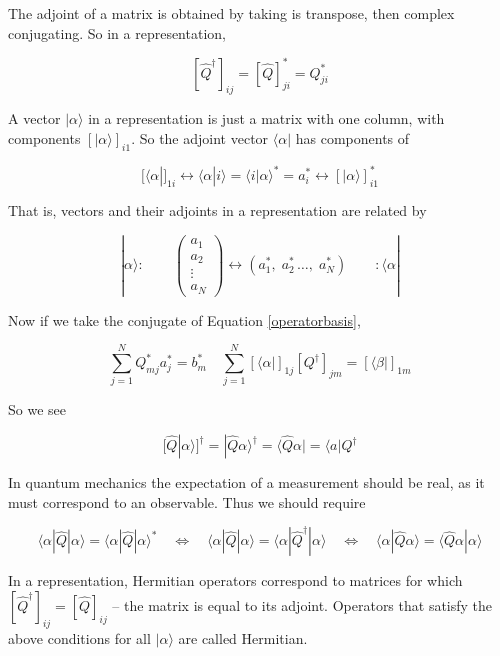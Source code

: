 The adjoint of a matrix is obtained by taking is transpose, then complex
conjugating. So in a representation, 

\[
  [\hat{Q}^\dagger]_{ij} = [\hat{Q}]_{ji}^* = Q_{ji}^*
\] \vspace{3px}


A vector $| \alpha \rangle$ in a representation is just a matrix with one
column, with components $[|\alpha\rangle]_{i1}$. So the adjoint vector $\langle
\alpha |$ has components of 

\[
  [\langle \alpha | ]_{1i} \leftrightarrow \langle \alpha | i\rangle = \langle
  i | \alpha \rangle^* = a_i^* \leftrightarrow [|\alpha\rangle ]^*_{i1}
\] \vspace{3px}

That is, vectors and their adjoints in a representation are related by 

\[
|\alpha \rangle: \qquad \begin{pmatrix}
  a_1 \\ a_2 \\ \vdots \\ a_N
\end{pmatrix}  \leftrightarrow (a_1^*, \; a_2^*\, \hdots, \; a_N^*) \qquad
:\langle \alpha |
\] \vspace{3px}

Now if we take the conjugate of Equation \ref{operatorbasis}, 

\[
  \sum_{j=1}^{N} Q^*_{mj} a^*_j = b^*_m \quad \sum_{j=1}^{N} [\langle \alpha
  | ]_{1j}[Q^\dagger ]_{jm} = [\langle \beta | ]_{1m}  
\] \vspace{3px}

So we see 

\[
  [\hat{Q}|\alpha \rangle ]^\dagger = |\hat{Q}\alpha \rangle^\dagger
  = \langle \hat{Q} \alpha | = \langle a | Q^\dagger 
\] \vspace{3px}

In quantum mechanics the expectation of a measurement should be real, as it
must correspond to an observable. Thus we should require 

\[
\langle \alpha | \hat{Q} | \alpha \rangle = \langle \alpha | \hat{Q} | \alpha
\rangle^* \quad \Leftrightarrow \quad \langle \alpha | \hat{Q} | \alpha \rangle
= \langle \alpha | \hat{Q}^\dagger | \alpha \rangle \quad \Leftrightarrow \quad
\langle \alpha | \hat{Q} \alpha \rangle = \langle \hat{Q} \alpha
| \alpha\rangle
\] \vspace{3px}

In a representation, Hermitian operators correspond to matrices for which
$[\hat{Q}^\dagger]_{ij} = [\hat{Q}]_{ij}$ -- the matrix is equal to its
adjoint. Operators that satisfy the above conditions for all $|\alpha\rangle$
are called Hermitian. 


